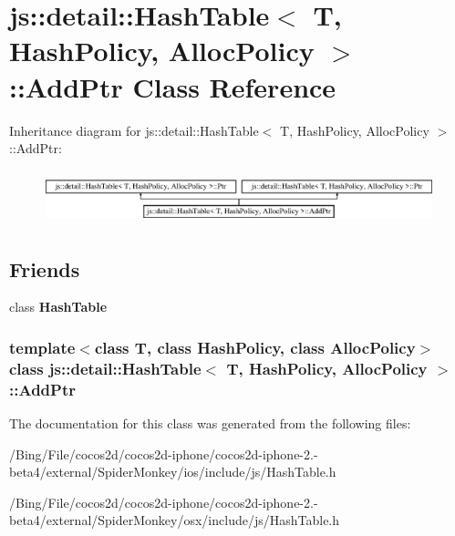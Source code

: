 \hypertarget{classjs_1_1detail_1_1_hash_table_1_1_add_ptr}{\section{js\-:\-:detail\-:\-:Hash\-Table$<$ T, Hash\-Policy, Alloc\-Policy $>$\-:\-:Add\-Ptr Class Reference}
\label{classjs_1_1detail_1_1_hash_table_1_1_add_ptr}
}
Inheritance diagram for js\-:\-:detail\-:\-:Hash\-Table$<$ T, Hash\-Policy, Alloc\-Policy $>$\-:\-:Add\-Ptr\-:\begin{figure}[H]
\begin{center}
\leavevmode
\includegraphics[height=1.586402cm]{classjs_1_1detail_1_1_hash_table_1_1_add_ptr}
\end{center}
\end{figure}
\subsection*{Friends}
\begin{DoxyCompactItemize}
\item 
\hypertarget{classjs_1_1detail_1_1_hash_table_1_1_add_ptr_a0d65cc1d3f862388016ca21139b4659a}{class {\bfseries Hash\-Table}}\label{classjs_1_1detail_1_1_hash_table_1_1_add_ptr_a0d65cc1d3f862388016ca21139b4659a}

\end{DoxyCompactItemize}
\subsubsection*{template$<$class T, class Hash\-Policy, class Alloc\-Policy$>$ class js\-::detail\-::\-Hash\-Table$<$ T, Hash\-Policy, Alloc\-Policy $>$\-::\-Add\-Ptr}



The documentation for this class was generated from the following files\-:\begin{DoxyCompactItemize}
\item 
/\-Bing/\-File/cocos2d/cocos2d-\/iphone/cocos2d-\/iphone-\/2.-\/beta4/external/\-Spider\-Monkey/ios/include/js/Hash\-Table.\-h\item 
/\-Bing/\-File/cocos2d/cocos2d-\/iphone/cocos2d-\/iphone-\/2.-\/beta4/external/\-Spider\-Monkey/osx/include/js/Hash\-Table.\-h\end{DoxyCompactItemize}
